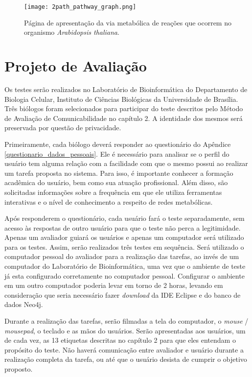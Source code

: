 \begin{figure}[!h]
    \centering
    \texttt{[image: 2path\_pathway\_graph.png]}
    \caption{Página de apresentação da via metabólica de reações que ocorrem no organismo \textit{Arabidopsis thaliana}.}
    \label{fig:2path_pathway_graph}
\end{figure}

\section{Projeto de Avaliação} \label{avaliacao}

\indent Os testes serão realizados no Laboratório de Bioinformática do Departamento de Biologia Celular, Instituto de Ciências Biológicas da Universidade de Brasília. Três biólogos foram selecionados para participar do teste descritos pelo Método de Avaliação de Comunicabilidade no capítulo 2. A identidade dos mesmos será preservada por questão de privacidade.

\indent Primeiramente, cada biólogo deverá responder ao questionário do Apêndice \ref{questionario_dados_pessoais}. Ele é necessário para analisar se o perfil do usuário tem alguma relação com a facilidade com que o mesmo possui ao realizar um tarefa proposta no sistema. Para isso, é importante conhecer a formação acadêmica do usuário, bem como sua atuação profissional. Além disso, são solicitadas informações sobre a frequência em que ele utiliza ferramentas interativas e o nível de conhecimento a respeito de redes metabólicas. 

\indent Após responderem o questionário, cada usuário fará o teste separadamente, sem acesso às respostas de outro usuário para que o teste não perca a legitimidade. Apenas um avaliador guiará os usuários e apenas um computador será utilizado para os testes. Assim, serão realizados três testes em sequência. Será utilizado o computador pessoal do avaliador para a realização das tarefas, ao invés de um computador do Laboratório de Bioinformática, uma vez que o ambiente de teste já esta configurado corretamente no computador pessoal. Configurar o ambiente em um outro computador poderia levar em torno de 2 horas, levando em consideração que seria necessário fazer \textit{download} da IDE Eclipse e do banco de dados Neo4j.

\indent Durante a realização das tarefas, serão filmadas a tela do computador, o \textit{mouse} / \textit{mousepad}, o teclado e as mãos do usuários. Serão apresentadas aos usuários, um de cada vez, as 13 etiquetas descritas no capítulo 2 para que eles entendam o propósito do teste. Não haverá comunicação entre avaliador e usuário durante a realização completa da tarefa, ou até que o usuário desista de cumprir o objetivo proposto.

